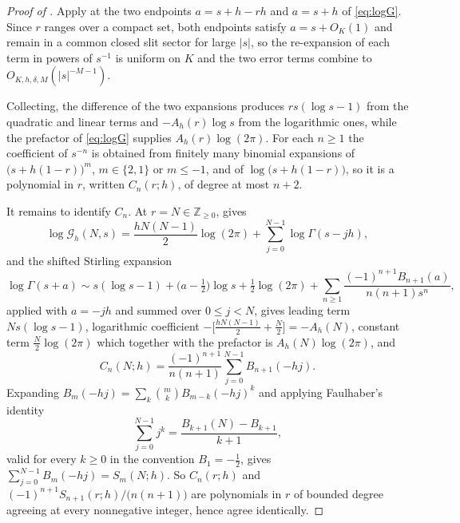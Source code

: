 \documentclass[11pt,letterpaper]{article}
\newcommand{\Gc}{\mathcal{G}}               %
\newcommand{\Zint}{\mathbb{Z}}
\begin{document}
\begin{proof}[Proof of ]
Apply  at the two endpoints $a=s+h-rh$ and $a=s+h$ of
\eqref{eq:logG}. Since $r$ ranges over a compact set, both endpoints satisfy
$a=s+O_K(1)$ and remain in a common closed slit sector for large $\lvert s\rvert$,
so the re-expansion of each term in powers of $s^{-1}$ is uniform on $K$ and the
two error terms combine to $O_{K,h,\delta,M}(\lvert s\rvert^{-M-1})$.

Collecting, the difference of the two expansions produces $rs(\log s-1)$ from the
quadratic and linear terms and $-A_h(r)\log s$ from the logarithmic ones, while
the prefactor of \eqref{eq:logG} supplies $A_h(r)\log(2\pi)$. For each $n\ge1$
the coefficient of $s^{-n}$ is obtained from finitely many binomial expansions of
$\bigl(s+h(1-r)\bigr)^{m}$, $m\in\{2,1\}$ or $m\le-1$, and of $\log\bigl(s+h(1-r)\bigr)$, so it is a
polynomial in $r$, written $C_n(r;h)$, of degree at most $n+2$.

It remains to identify $C_n$. At $r=N\in\Zint_{\ge0}$,  gives
\begin{equation*}
  \log\Gc_h(N,s)=\frac{hN(N-1)}{2}\log(2\pi)+\sum_{j=0}^{N-1}\log\Gamma(s-jh),
\end{equation*}
and the shifted Stirling expansion
\begin{equation*}
  \log\Gamma(s+a)\sim s(\log s-1)+\bigl(a-\tfrac12\bigr)\log s
  +\tfrac12\log(2\pi)+\sum_{n\ge1}\frac{(-1)^{n+1}B_{n+1}(a)}{n(n+1)s^{n}},
\end{equation*}
applied with $a=-jh$ and summed over $0\le j<N$, gives leading term
$Ns(\log s-1)$, logarithmic coefficient
$-\bigl[\tfrac{hN(N-1)}{2}+\tfrac N2\bigr]=-A_h(N)$, constant term
$\tfrac N2\log(2\pi)$ which together with the prefactor is $A_h(N)\log(2\pi)$,
and
\begin{equation*}
  C_n(N;h)=\frac{(-1)^{n+1}}{n(n+1)}\sum_{j=0}^{N-1}B_{n+1}(-hj).
\end{equation*}
Expanding $B_m(-hj)=\sum_{k}\binom mk B_{m-k}(-hj)^{k}$ and applying Faulhaber's
identity
\begin{equation*}
  \sum_{j=0}^{N-1}j^{k}=\frac{B_{k+1}(N)-B_{k+1}}{k+1},
\end{equation*}
valid for every $k\ge0$ in the convention $B_1=-\tfrac12$, gives
$\sum_{j=0}^{N-1}B_m(-hj)=S_m(N;h)$. So $C_n(r;h)$ and
$(-1)^{n+1}S_{n+1}(r;h)/\bigl(n(n+1)\bigr)$ are polynomials in $r$ of bounded
degree agreeing at every nonnegative integer, hence agree identically.
\end{proof}
\end{document}
